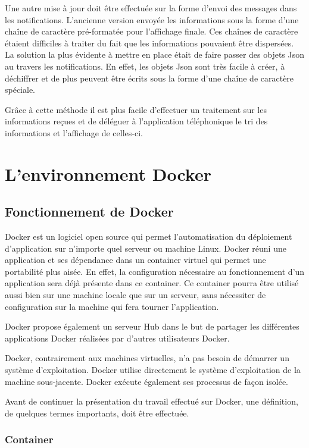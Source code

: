 Une autre mise à jour doit être effectuée sur la forme d'envoi des messages dans les notifications. L'ancienne version envoyée les informations sous la forme d'une chaîne de caractère pré-formatée pour l'affichage finale. Ces chaînes de caractère étaient difficiles à traiter du fait que les informations pouvaient être dispersées. La solution la plus évidente à mettre en place était de faire passer des objets Json au travers les notifications. En effet, les objets Json sont très facile à créer, à déchiffrer et de plus peuvent être écrits sous la forme d'une chaîne de caractère spéciale.

Grâce à cette méthode il est plus facile d'effectuer un traitement sur les informations reçues et de déléguer à l'application téléphonique le tri des informations et l'affichage de celles-ci.

\section{L'environnement Docker}

\subsection{Fonctionnement de Docker}

Docker est un logiciel open source qui permet l'automatisation du déploiement d'application sur n'importe quel serveur ou machine Linux. Docker réuni une application et ses dépendance dans un container virtuel qui permet une portabilité plus aisée. En effet, la configuration nécessaire au fonctionnement d'un application sera déjà présente dans ce container. Ce container pourra être utilisé aussi bien sur une machine locale que sur un serveur, sans nécessiter de configuration sur la machine qui fera tourner l'application. 

Docker propose également un serveur Hub dans le but de partager les différentes applications Docker réalisées par d'autres utilisateurs Docker.

Docker, contrairement aux machines virtuelles, n'a pas besoin de démarrer un système d'exploitation. Docker utilise directement le système d'exploitation de la machine sous-jacente. Docker exécute également ses processus de façon isolée.

Avant de continuer la présentation du travail effectué sur Docker, une définition, de quelques termes importants, doit être effectuée. 



\subsubsection{Container}

